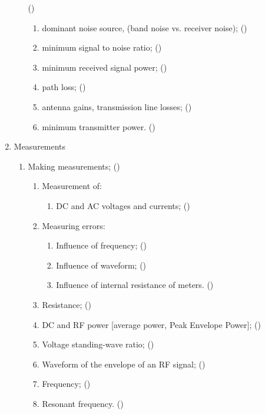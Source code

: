 \begin{flushleft}
\begin{enumerate}
\begin{enumerate}
  ()\label{HAREC.a.7.20}
\begin{enumerate}
\item dominant noise source, (band noise vs. receiver noise);
  ()\label{HAREC.a.7.20.1}
\item minimum signal to noise ratio;
  ()\label{HAREC.a.7.20.2}
\item minimum received signal power;
  ()\label{HAREC.a.7.20.3}
\item path loss;
  ()\label{HAREC.a.7.20.4}
\item antenna gains, transmission line losses;
  ()\label{HAREC.a.7.20.5}
\item minimum transmitter power.
  ()\label{HAREC.a.7.20.6}
\end{enumerate}
\end{enumerate}

\item Measurements
\begin{enumerate}

\item Making measurements; ()\label{HAREC.a.8.1}
\begin{enumerate}
\item Measurement of:
\begin{enumerate}
\item DC and AC voltages and currents;
  ()\label{HAREC.a.8.1.1.1}
\end{enumerate}
\item Measuring errors:
\begin{enumerate}
\item Influence of frequency; ()\label{HAREC.a.8.1.2.1}
\item Influence of waveform; ()\label{HAREC.a.8.1.2.2}
\item Influence of internal resistance of meters.
  ()\label{HAREC.a.8.1.2.3}
\end{enumerate}
\item Resistance; ()\label{HAREC.a.8.1.3}
\item DC and RF power [average power, Peak Envelope Power];
  ()\label{HAREC.a.8.1.4}
\item Voltage standing-wave ratio; ()\label{HAREC.a.8.1.5}
\item Waveform of the envelope of an RF signal;
  ()\label{HAREC.a.8.1.6}
\item Frequency; ()\label{HAREC.a.8.1.7}
\item Resonant frequency. ()\label{HAREC.a.8.1.8}
\end{enumerate}


\end{enumerate}
\end{enumerate}
\end{flushleft}
